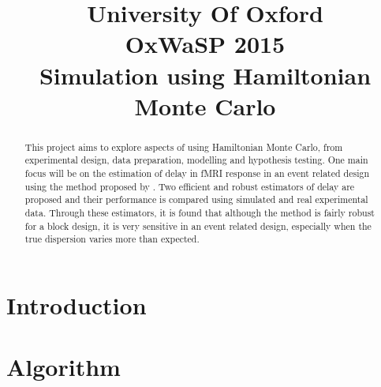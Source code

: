 \documentclass{article}
\title{University Of Oxford \\ OxWaSP 2015\\
Simulation using Hamiltonian Monte Carlo}
\begin{document}
\maketitle
\pagebreak
\begin{abstract}
\noindent
This project aims to explore aspects of using Hamiltonian Monte Carlo, from experimental design, data preparation, modelling and hypothesis testing. One main focus will be on the estimation of delay in fMRI response in an event related design using the method proposed by \cite{liao2002estimating}. Two efficient and robust estimators of delay are proposed and their performance is compared using simulated and real experimental data. Through these estimators, it is found that although the method is fairly robust for a block design, it is very sensitive in an event related design, especially when the true dispersion varies more than expected. \\
\noindent
\end{abstract}

\renewcommand{\abstractname}{Acknowledgements}
\begin{abstract}
\noindent \end{abstract}
\pagebreak
 \tableofcontents
 
 \pagebreak
 \section{Introduction} 
 \section{Algorithm}
 
\end{document}
